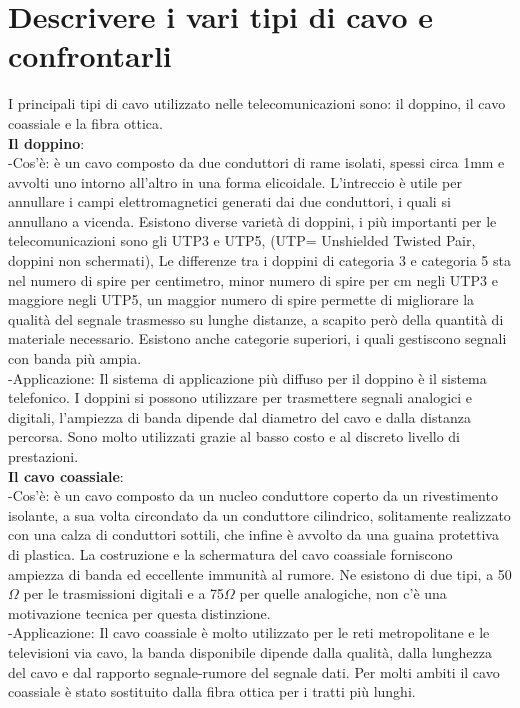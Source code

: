 \section{Descrivere i vari tipi di cavo e confrontarli}
I principali tipi di cavo utilizzato nelle telecomunicazioni sono: il doppino, il cavo coassiale e la fibra ottica. \\
\textbf{Il doppino}:\\
-Cos’è: è un cavo composto da due conduttori di rame isolati, spessi circa 1mm e avvolti uno intorno all’altro in una forma elicoidale. L’intreccio è utile per annullare i campi elettromagnetici generati dai due conduttori, i quali si annullano a vicenda. Esistono diverse varietà di doppini, i più importanti per le telecomunicazioni sono gli UTP3 e UTP5, (UTP= Unshielded Twisted Pair, doppini non schermati), Le differenze tra i doppini di categoria 3 e categoria 5 sta nel numero di spire per centimetro, minor numero di spire per cm negli UTP3 e maggiore negli UTP5, un maggior numero di spire permette di migliorare la qualità del segnale trasmesso su lunghe distanze, a scapito però della quantità di materiale necessario. Esistono anche categorie superiori, i quali gestiscono segnali con banda più ampia.  \\


-Applicazione: Il sistema di applicazione più diffuso per il doppino è il sistema telefonico. I doppini si 	possono utilizzare per trasmettere segnali analogici e digitali, l’ampiezza di banda dipende dal diametro del cavo e dalla distanza percorsa. Sono molto utilizzati grazie al basso costo e al discreto livello di prestazioni. \\
\textbf{Il cavo coassiale}: \\
-Cos’è: è un cavo composto da un nucleo conduttore coperto da un rivestimento isolante, a sua volta circondato da un conduttore cilindrico, solitamente realizzato con una calza di conduttori sottili, che infine è avvolto da una guaina protettiva di plastica. La costruzione e la schermatura del cavo coassiale forniscono ampiezza di banda ed eccellente immunità al rumore. Ne esistono di due tipi, a 50$\Omega$ per le trasmissioni digitali e a 75$\Omega$ per quelle analogiche, non c’è una motivazione tecnica per questa distinzione.\\
-Applicazione: Il cavo coassiale è molto utilizzato per le reti metropolitane e le televisioni via cavo, la banda disponibile dipende dalla qualità, dalla lunghezza del cavo e dal rapporto segnale-rumore del segnale dati. Per molti ambiti il cavo coassiale è stato sostituito dalla fibra ottica per i tratti più lunghi.


